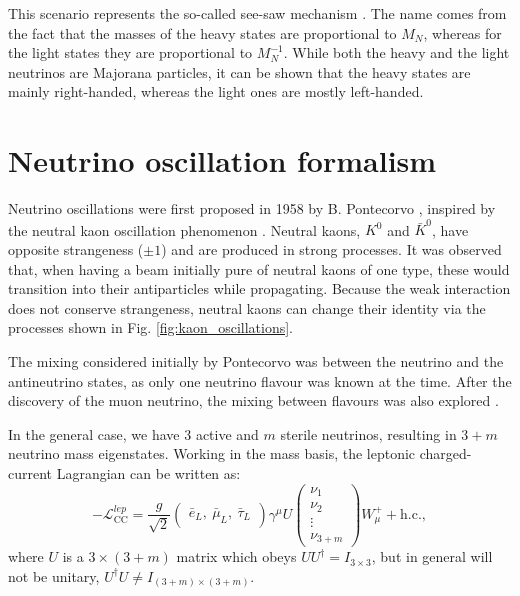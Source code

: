 This scenario represents the so-called see-saw mechanism \cite{Minkowski1977,Gell-Mann1979,Yanagida1979,Mohapatra1979,Schechter1980}. The name comes from the fact that the masses of the heavy states are proportional to $M_{N}$, whereas for the light states they are proportional to $M_{N}^{-1}$. While both the heavy and the light neutrinos are Majorana particles, it can be shown that the heavy states are mainly right-handed, whereas the light ones are mostly left-handed.

\section{Neutrino oscillation formalism}\label{sec:nu_oscillations}

Neutrino oscillations were first proposed in 1958 by B. Pontecorvo \cite{Pontecorvo1957a}, inspired by the neutral kaon oscillation phenomenon \cite{Gell-Mann1955}. Neutral kaons, $K^{0}$ and $\bar{K}^{0}$, have opposite strangeness ($\pm 1$) and are produced in strong processes. It was observed that, when having a beam initially pure of neutral kaons of one type, these would transition into their antiparticles while propagating. Because the weak interaction does not conserve strangeness, neutral kaons can change their identity via the processes shown in Fig. \ref{fig:kaon_oscillations}.

The mixing considered initially by Pontecorvo was between the neutrino and the antineutrino states, as only one neutrino flavour was known at the time. After the discovery of the muon neutrino, the mixing between flavours was also explored \cite{Pontecorvo1967}.

In the general case, we have $3$ active and $m$ sterile neutrinos, resulting in $3+m$ neutrino mass eigenstates. Working in the mass basis, the leptonic charged-current Lagrangian can be written as:
\begin{equation}
	-\mathcal{L}_{\mathrm{CC}}^{lep} = \frac{g}{\sqrt{2}} \begin{pmatrix}\bar{e}_{L},~ \bar{\mu}_{L},~ \bar{\tau}_{L}\end{pmatrix} \gamma^{\mu} U \begin{pmatrix}\nu_{1}\\\nu_{2}\\\vdots\\\nu_{3+m}\end{pmatrix} W_{\mu}^{+} + \mathrm{h.c.},
\end{equation}
where $U$ is a $3\times(3+m)$ matrix which obeys $UU^{\dagger} = I_{3 \times 3}$, but in general will not be unitary, $U^{\dagger}U\neq I_{(3+m) \times (3+m)}$.

